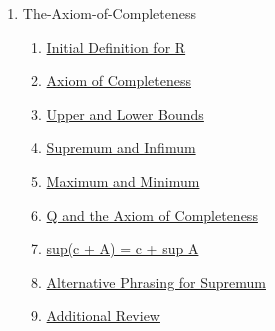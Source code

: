 \clearpage
\renewcommand{\notetitle}{Table of Contents}
\label{toc}
\begin{enumerate}

\item The-Axiom-of-Completeness
\begin{enumerate}
\item \hyperref[202501180703]{Initial Definition for R}
\item \hyperref[202501180727]{Axiom of Completeness}
\item \hyperref[202501180734]{Upper and Lower Bounds}
\item \hyperref[202501180743]{Supremum and Infimum}
\item \hyperref[202501181241]{Maximum and Minimum}
\item \hyperref[202501181257]{Q and the Axiom of Completeness}
\item \hyperref[202501181310]{sup(c + A) = c + sup A}
\item \hyperref[202501181335]{Alternative Phrasing for Supremum}
\item \hyperref[202501181521]{Additional Review}
\end{enumerate}
\end{enumerate}

\newpage
